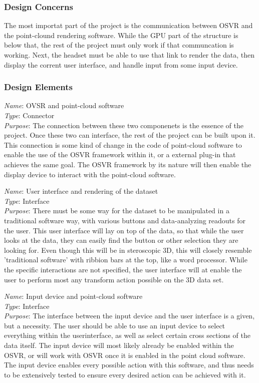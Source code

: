 \subsubsection{Design Concerns}
The most importat part of the project is the communication between OSVR and the point-clound rendering software.
While the GPU part of the structure is below that, the rest of the project must only work if that communcation is working.
Next, the headset must be able to use that link to render the data, then display the corrent user interface, and handle
input from some input device.

\subsubsection{Design Elements}

\textit{Name}: OVSR and point-cloud software\\
\textit{Type}: Connector\\
\textit{Purpose}: The connection between these two componenets is the essence of the project. Once these two can interface,
the rest of the project can be built upon it. This connection is some kind of change in the code of point-cloud software
to enable the use of the OSVR framework within it, or a external plug-in that achieves the same goal. The OSVR framework
by its nature will then enable the display device to interact with the point-cloud software.\\
\newline

\textit{Name}: User interface and rendering of the dataset\\
\textit{Type}: Interface\\
\textit{Purpose}: There must be some way for the dataset to be manipulated in a traditional software way, with various
buttons and data-analyzing readouts for the user. This user interface will lay on top of the data, so that while the user
looks at the data, they can easily find the button or other selection they are looking for. Even though this will be in
steroscopic 3D, this will closely resemble 'traditional software' with ribbion bars at the top, like a word processor.
While the specific interactions are not specified, the user interface will at enable the user to perform most any transform
action possible on the 3D data set.\\
\newline

\textit{Name}: Input device and point-cloud software\\
\textit{Type}: Interface\\
\textit{Purpose}: The interface between the input device and the user interface is a given, but a necessity. The user should
be able to use an input device to select everything within the userinterface, as well as select certain cross sections of the
data itself. The input device will most likely already be enabled within the OSVR, or will work with OSVR once it is enabled
in the point cloud software. The input device enables every possible action with this software, and thus needs to be extensively
tested to ensure every desired action can be achieved with it.


